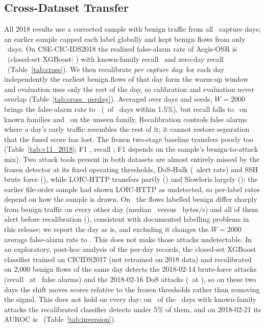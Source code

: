 \documentclass[conference]{IEEEtran}
\begin{document}
\subsection{Cross-Dataset Transfer}\label{sec:cross}
All 2018 results use a corrected sample with benign traffic from all \FactXSampleDays\ capture days; an earlier sample capped each label globally and kept benign flows from only \FactXVOneBenignDays\ days. On CSE-CIC-IDS2018 the realized false-alarm rate of Aegis-OSR is \CrossOsrFpr\ (closed-set XGBoost: \CrossXgbFpr) with known-family recall \CrossOsrKnown\ and zero-day recall \CrossOsrZdr\ (Table~\ref{tab:cross}). We then recalibrate \emph{per capture day}: for each day independently the earliest benign flows of that day form the warm-up window and evaluation uses only the rest of the day, so calibration and evaluation never overlap (Table~\ref{tab:cross_perday}). Averaged over days and seeds, $W=2000$ brings the false-alarm rate to \FactPdRecalTwoZeroZeroZeroFpr\ (\FactPdDaysWithin\ of \FactPdDays\ days within 1.5\%), but recall falls to \FactPdRecalTwoZeroZeroZeroKnown\ on known families and \FactPdRecalTwoZeroZeroZeroZdr\ on the unseen family. Recalibration controls false alarms where a day's early traffic resembles the rest of it; it cannot restore separation that the fused score has lost. The frozen two-stage baseline transfers poorly too (Table~\ref{tab:v11_2018}; F1 \FrozenEighteenFone, recall \FrozenEighteenRecall; F1 depends on the sample's benign-to-attack mix). Two attack tools present in both datasets are almost entirely missed by the frozen detector at its fixed operating thresholds, DoS-Hulk (\FrozenEighteenHulk\ alert rate) and SSH brute force (\FrozenEighteenSsh), while LOIC-HTTP transfers partly (\FrozenEighteenLoicHttp) and Slowloris largely (\FrozenEighteenSlowloris); the earlier file-order sample had shown LOIC-HTTP as undetected, so per-label rates depend on how the sample is drawn. On \FactPdAnomalyDay\ the flows labelled benign differ sharply from benign traffic on every other day (median \FactPdAnomalyBytes\ versus \FactPdOtherBytesMedian\ bytes/s) and all of them alert before recalibration (\FactPdAnomalyNoneFpr), consistent with documented labelling problems in this release; we report the day as is, and excluding it changes the $W=2000$ average false-alarm rate to \FactPdRecalTwoZeroZeroZeroFprExcl. This does not make those attacks undetectable. In an exploratory, post-hoc analysis of the per-day records, the closed-set XGBoost classifier trained on CICIDS2017 (not retrained on 2018 data) and recalibrated on 2{,}000 benign flows of the same day detects the 2018-02-14 brute-force attacks (recall \FactRdXgbBfKnown\ at \FactRdXgbBfFpr\ false alarms) and the 2018-02-16 DoS attacks (\FactRdXgbDosKnown\ at \FactRdXgbDosFpr), so on these two days the shift moves scores relative to the frozen thresholds rather than removing the signal. This does not hold on every day: on \FactRaXgbLowDays\ of the \FactRaKnownDays\ days with known-family attacks the recalibrated classifier detects under 5\% of them, and on 2018-02-21 its AUROC is \FactRaXgbAurocZeroTwoTwoOne\ (Table~\ref{tab:inversion}).
\end{document}
